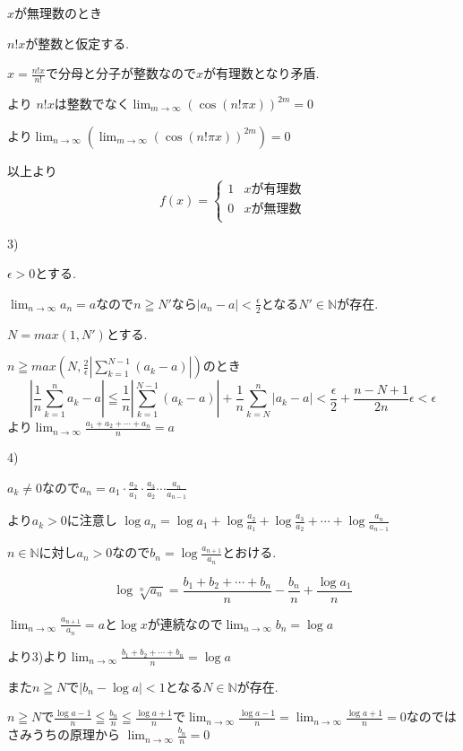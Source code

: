 \documentclass{jsarticle}
\begin{document}
$x$が無理数のとき

$n!x$が整数と仮定する.

$x=\frac{n!x}{n!}$で分母と分子が整数なので$x$が有理数となり矛盾.

より
$n!x$は整数でなく$\displaystyle\lim_{m\to \infty} (\cos(n!\pi x))^{2m} = 0$

より$\displaystyle\lim_{n\to \infty}(\lim_{m\to \infty} (\cos(n!\pi x))^{2m}) = 0$

以上より
\[f(x) = \begin{cases}
1 & xが有理数 \\
0 & xが無理数 \\
\end{cases}\]

3)

$\epsilon > 0$とする.

$\displaystyle\lim_{n\to \infty}a_n=a$なので$n\geqq N'$なら$|a_n-a|<\frac{\epsilon}{2}$となる$N'\in \mathbb{N}$が存在.

$N=max(1,N')$とする.

$n\geqq max(N,\frac{2}{\epsilon}|\sum_{k=1}^{N-1}(a_k-a)|)$のとき
\[
|\frac{1}{n}\sum_{k=1}^n a_k - a| \leqq \frac{1}{n}|\sum_{k=1}^{N-1}(a_k-a)|+\frac{1}{n}\sum_{k=N}^{n}|a_k-a|<\frac{\epsilon}{2} + \frac{n-N+1}{2n}\epsilon<\epsilon
\]
より$\displaystyle\lim_{n\to \infty}\frac{a_1+a_2+\cdots+a_n}{n}=a$

4)

$a_k\neq0$なので$a_n=a_1\cdot \frac{a_2}{a_1}\cdot \frac{a_3}{a_2}\cdots \frac{a_n}{a_{n-1}}$

より$a_k>0$に注意し
$\log a_n = \log a_1 + \log \frac{a_2}{a_1}+\log \frac{a_3}{a_2}+\cdots +\log \frac{a_n}{a_{n-1}}$

$n\in\mathbb{N}$に対し$a_n > 0$なので$b_n=\log \frac{a_{n+1}}{a_n}$とおける.

\[\log \sqrt[n]{a_n}=\frac{b_1+b_2+\cdots +b_n}{n} - \frac{b_n}{n}+\frac{\log a_1}{n}\]

$\displaystyle\lim_{n\to \infty}\frac{a_{n+1}}{a_n}=a$と$\log x$が連続なので$\displaystyle\lim_{n\to \infty}b_n=\log a$

より3)より$\displaystyle\lim _{n\to \infty}\frac{b_1+b_2+\cdots +b_n}{n} = \log a$

また$n\geqq N$で$|b_n - \log a|<1$となる$N\in\mathbb{N}$が存在.

$n\geqq N$で$\frac{\log a -1}{n}\leqq \frac{b_n}{n} \leqq \frac{\log a+1}{n}$で$\displaystyle\lim_{n\to\infty}\frac{\log a -1}{n} = \lim_{n\to\infty}\frac{\log a +1}{n}=0$なのではさみうちの原理から
$\displaystyle\lim_{n\to\infty} \frac{b_n}{n} = 0$
\end{document}
